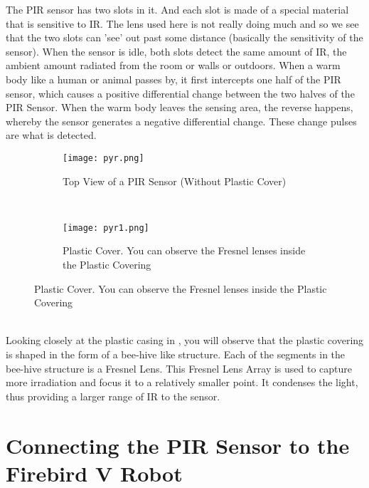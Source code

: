 \documentclass[a4paper,12 pt]{article}
\begin{document}
The PIR sensor has two slots in it. And each slot is made of a special material that is sensitive to IR. The lens used here is not really doing much and so we see that the two slots can 'see' out past some distance (basically the sensitivity of the sensor). When the sensor is idle, both slots detect the same amount of IR, the ambient amount radiated from the room or walls or outdoors. When a warm body like a human or animal passes by, it first intercepts one half of the PIR sensor, which causes a positive differential change between the two halves of the PIR Sensor. When the warm body leaves the sensing area, the reverse happens, whereby the sensor generates a negative differential change. These change pulses are what is detected.
\pagebreak
\begin{figure}[h]
        \centering
        \begin{subfigure}[b]{0.45\textwidth}
                \texttt{[image: pyr.png]}
                \caption{ Top View of a PIR Sensor (Without Plastic Cover)}
                \label{fig:8a}
        \end{subfigure}%
        ~ %
        \begin{subfigure}[b]{0.45\textwidth}
                \texttt{[image: pyr1.png]}
                \caption{Plastic Cover. You can observe the Fresnel lenses inside the Plastic Covering}
                \label{fig:8b}
        \end{subfigure}
        
\end{figure}

\\
Looking closely at the plastic casing in , you will observe that the plastic covering is shaped in the form of a bee-hive like structure. Each of the segments in the bee-hive structure is a Fresnel Lens. This Fresnel Lens Array is used to capture more irradiation and focus it to a relatively smaller point. It condenses the light, thus providing a larger range of IR to the sensor.

\pagebreak
\section{Connecting the PIR Sensor to the Firebird V Robot}
\end{document}
